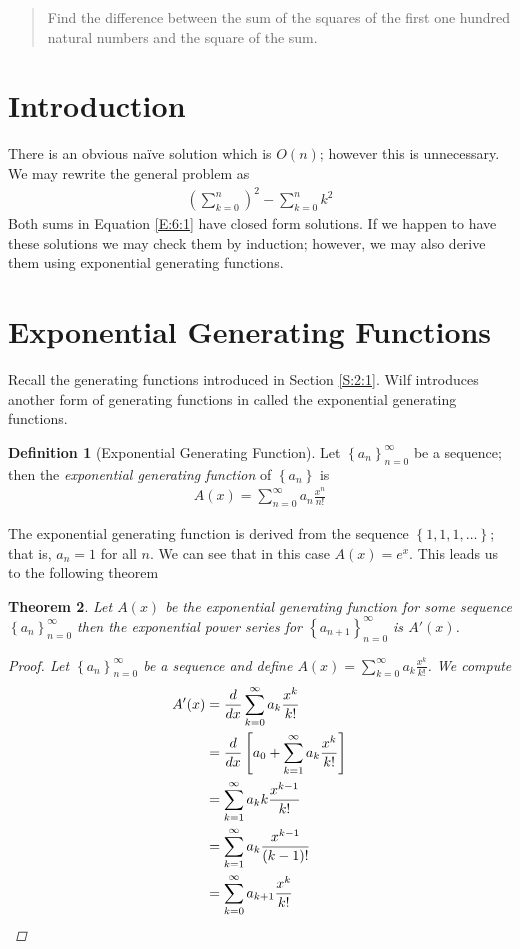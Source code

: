 \documentclass[oneside,12pt]{book}   	%
\newcounter{ex}
\newcounter{def}
\newcounter{pr}
\newtheorem{thm}{Theorem}[chapter]
\theoremstyle{definition}
\newtheorem{definition}[thm]{Definition}
\newcommand{\set}[1]{\left\{#1\right\}}
\begin{document}
\begin{spacing}{1.618}
\begin{quote}
			Find the difference between the sum of the squares of the first one hundred natural numbers and the square of the sum. 
		\end{quote}
	
		\section{Introduction}
		
			There is an obvious na\"ive solution which is $O(n)$; however this is unnecessary. We may rewrite the general problem as 
			\begin{alignat}{4}
				\left(\sum_{k=0}^n\right)^2 - \sum_{k=0}^n k^2 \label{E:6:1}
			\end{alignat}
			Both sums in Equation \ref{E:6:1} have closed form solutions. If we happen to have these solutions we may check them by induction; however, we may also derive them using exponential generating functions. 
			
		\section{Exponential Generating Functions}
			Recall the generating functions introduced in Section \ref{S:2:1}. Wilf introduces another form of generating functions in \cite{Wilf2006} called the exponential generating functions. 
			\begin{definition}[Exponential Generating Function]
				Let $\set{a_n}_{n=0}^\infty$ be a sequence; then the \emph{exponential generating function} of $\set{a_n}$ is
				\begin{alignat}{4}
					A(x)=\sum_{n=0}^\infty a_n\frac{x^n}{n!}
				\end{alignat}
			\end{definition}
			The exponential generating function is derived from the sequence $\set{1, 1, 1, \dots}$; that is, $a_n=1$ for all $n$. We can see that in this case $A(x)=e^x$. This leads us to the following theorem
			\begin{thm}\label{T:6:1}
				Let $A(x)$ be the exponential generating function for some sequence $\set{a_n}_{n=0}^\infty$ then the exponential power series for $\set{a_{n+1}}_{n=0}^\infty$ is $A'(x)$. 
				\begin{proof}
					Let $\set{a_n}_{n=0}^\infty$ be a sequence and define $A(x)=\sum_{k=0}^\infty a_k\frac{x^k}{k!}$. We compute
					\begin{alignat}{4}
						A'(x)&=\frac{d}{dx}\sum_{k=0}^\infty a_k\frac{x^k}{k!} \notag \\
							&=\frac{d}{dx}\left[a_0 + \sum_{k=1}^\infty a_k\frac{x^k}{k!}\right] \notag \\
							&=\sum_{k=1}^\infty a_k k \frac{x^{k-1}}{k!} \notag \\
							&=\sum_{k=1}^\infty a_k\frac{x^{k-1}}{(k-1)!} \notag \\
							&=\sum_{k=0}^\infty a_{k+1}\frac{x^k}{k!} \notag 
					\end{alignat}
				\end{proof}
			\end{thm}
			

\end{spacing}
\end{document}
